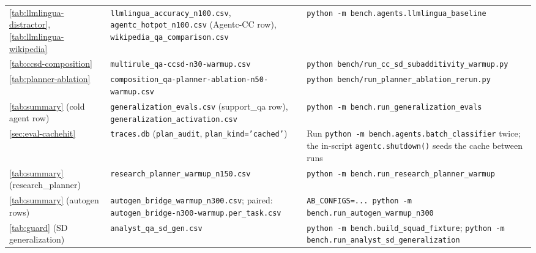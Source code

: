 \begin{table}[t]
\begin{tabularx}{\linewidth}{p{1.7cm} >{\raggedright\arraybackslash}X >{\raggedright\arraybackslash}X}
\addlinespace
\ref{tab:llmlingua-distractor}, \ref{tab:llmlingua-wikipedia} &
\texttt{llmlingua\_\allowbreak accuracy\_\allowbreak n100.csv},
\texttt{agentc\_\allowbreak hotpot\_\allowbreak n100.csv} (Agentc-CC row),
\texttt{wikipedia\_\allowbreak qa\_\allowbreak comparison.csv} &
\texttt{python -m bench.agents.llmlingua\_\allowbreak baseline} \\

\addlinespace
\ref{tab:ccsd-composition} &
\texttt{multirule\_\allowbreak qa-\allowbreak ccsd-\allowbreak n30-\allowbreak warmup.csv} &
\texttt{python bench/run\_\allowbreak cc\_\allowbreak sd\_\allowbreak subadditivity\_\allowbreak warmup.py} \\

\addlinespace
\ref{tab:planner-ablation} &
\texttt{composition\_\allowbreak qa-\allowbreak planner-\allowbreak ablation-\allowbreak n50-\allowbreak warmup.csv} &
\texttt{python bench/run\_\allowbreak planner\_\allowbreak ablation\_\allowbreak rerun.py} \\

\addlinespace
\ref{tab:summary} (cold agent row) &
\texttt{generalization\_\allowbreak evals.csv} (support\_qa row),
\texttt{generalization\_\allowbreak activation.csv} &
\texttt{python -m bench.run\_\allowbreak generalization\_\allowbreak evals} \\

\addlinespace
\ref{sec:eval-cachehit} &
\texttt{traces.db} (\texttt{plan\_audit}, \texttt{plan\_kind='cached'}) &
Run \texttt{python -m bench.agents.batch\_\allowbreak classifier} twice; the
in-script \texttt{agentc.shutdown()} seeds the cache between runs \\

\addlinespace
\ref{tab:summary} (research\_\allowbreak planner) &
\texttt{research\_\allowbreak planner\_\allowbreak warmup\_\allowbreak n150.csv} &
\texttt{python -m bench.run\_\allowbreak research\_\allowbreak planner\_\allowbreak warmup} \\

\addlinespace
\ref{tab:summary} (autogen rows) &
\texttt{autogen\_\allowbreak bridge\_\allowbreak warmup\_\allowbreak n300.csv}; paired:
\texttt{autogen\_\allowbreak bridge-\allowbreak n300-\allowbreak warmup.per\_\allowbreak task.csv} &
\texttt{AB\_\allowbreak CONFIGS=...\ python -m bench.run\_\allowbreak autogen\_\allowbreak warmup\_\allowbreak n300} \\

\addlinespace
\ref{tab:guard} (SD generalization) &
\texttt{analyst\_\allowbreak qa\_\allowbreak sd\_\allowbreak gen.csv} &
\texttt{python -m bench.build\_\allowbreak squad\_\allowbreak fixture}; \texttt{python -m bench.run\_\allowbreak analyst\_\allowbreak sd\_\allowbreak generalization} \\


\end{tabularx}
\end{table}
